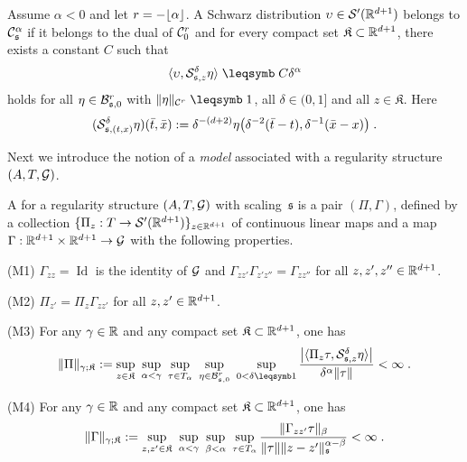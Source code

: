 \documentclass[reqno,11pt]{article}
\DeclareMathOperator{\Id}{Id}
\def\fraks{\mathfrak{s}}
\def\fraK{\mathfrak{K}}
\begin{document}
\begin{definition}
\label{def:C_alpha}
Assume $\alpha < 0$ and let $r=-\lfloor\alpha\rfloor$. A Schwarz distribution
$\upsilon\in{\mathcal S}'(\mathbb{R}^{d+1})$ belongs to $\cC^\alpha_{\fraks}$ if it
belongs to
the dual of ${\mathcal C}_0^r$ and for every compact set $\fraK\subset\R^{d+1}$,
there exists a constant $C$ such that 
\begin{equation}
 \label{eq:C_alpha}
 \pscal{\upsilon}{\cS^\delta_{\fraks,z}\eta} \leqs C\delta^\alpha
\end{equation} 
holds for all $\eta\in\cB^r_{\fraks,0}$ with $\norm{\eta}_{\cC^r}\leqs1$,
all $\delta\in(0,1]$ and all $z\in\fraK$. Here 
\begin{equation}
 \label{eq:Sdelta}
 (\cS^\delta_{\fraks,(t,x)}\eta)(\bar t,\bar x) :=
\delta^{-(d+2)}\eta\bigpar{\delta^{-2}(\bar t-t),\delta^{-1}(\bar x - x)}\;.
\end{equation} 
\end{definition}

Next we introduce the notion of a \emph{model} associated with a regularity
structure $(A,T,{\mathcal G})$. 

\begin{definition}
\label{def:model} 
A  for a regularity structure $(A,T,{\mathcal G})$ with scaling~$\fraks$ is
a pair $(\Pi,\Gamma)$, defined by a collection
$\{\Pi_z:T\to{\mathcal S}'(\mathbb{R}^{d+1})\}_{z\in\mathbb{R}^{d+1}}$ of continuous linear maps and a
map $\Gamma:\mathbb{R}^{d+1}\times\mathbb{R}^{d+1}\to {\mathcal G}$ with the following properties. 
\begin{enumH}
\item[(M1)] 	$\Gamma_{zz} = \Id$ is the identity of
${\mathcal G}$ and
$\Gamma_{zz'}\Gamma_{z'z''}=\Gamma_{zz''}$ for
all $z,z',z''\in\mathbb{R}^{d+1}$. 

\item[(M2)] 	$\Pi_{z'}=\Pi_z \Gamma_{zz'}$ for all $z,z'\in\mathbb{R}^{d+1}$. 

\item[(M3)] 	For any $\gamma\in\mathbb{R}$ and any compact set
$\fraK\subset{\R^{d+1}}$, one has 
\begin{equation}
 \label{eq:defmod1}
 \norm{\Pi}_{\gamma;\fraK} := 
 \sup_{z\in\fraK}~ \sup_{\alpha<\gamma} ~\sup_{\tau\in T_\alpha}~
\sup_{\eta\in\cB^r_{\fraks,0}}~\sup_{0<\delta\leqs1}
 \frac{\bigabs{\pscal{\Pi_z\tau}{\cS^\delta_{\fraks,z}\eta}}}{\delta^{
\alpha} \norm{\tau}} 
 < \infty\;.
\end{equation}

\item[(M4)] 	For any $\gamma\in\mathbb{R}$ and any compact set
$\fraK\subset{\R^{d+1}}$, one has 
\begin{equation}
 \label{eq:defmod2}
 \norm{\Gamma}_{\gamma;\fraK} := 
 \sup_{z,z'\in\fraK} ~\sup_{\alpha<\gamma}~
\sup_{\beta<\alpha}~\sup_{\tau\in T_\alpha}
 \frac{\norm{\Gamma_{zz'}\tau}_\beta}
 {\norm{\tau}\norm{z-z'}^{\alpha-\beta}_{\fraks}} < \infty\;.
\end{equation} 
\end{enumH}
\end{definition}
\end{document}
